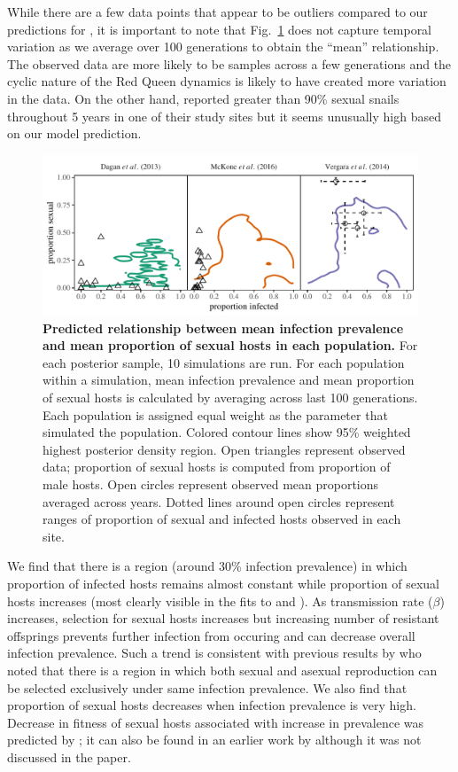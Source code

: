 \documentclass{article}\usepackage[]{graphicx}\usepackage[]{color}
\newcommand{\fref}[1]{Fig.~\ref{fig:#1}}
\begin{document}
While there are a few data points that appear to be outliers compared to our predictions for \cite{vergara2014infection},
it is important to note that \fref{ivs} does not capture temporal variation as we average over 100 generations to obtain the ``mean'' relationship.
The observed data are more likely to be samples across a few generations and the cyclic nature of the Red Queen dynamics is likely to have created more variation in the data.
On the other hand, \cite{vergara2014infection} reported greater than 90\% sexual snails throughout 5 years in one of their study sites but it seems unusually high based on our model prediction.

\begin{figure}[!ht]
\includegraphics[width=\textwidth]{../fig/simulated_data.pdf}
\caption{{\bf Predicted relationship between mean infection prevalence and mean proportion of sexual hosts in each population.}
For each posterior sample, 10 simulations are run.
For each population within a simulation, mean infection prevalence and mean proportion of sexual hosts is calculated by averaging across last 100 generations. 
Each population is assigned equal weight as the parameter that simulated the population.
Colored contour lines show 95\% weighted highest posterior density region.
Open triangles represent observed data; proportion of sexual hosts is computed from proportion of male hosts.
Open circles represent observed mean proportions averaged across years. Dotted lines around open circles represent ranges of proportion of sexual and infected hosts observed in each site.
}
\label{fig:ivs}
\end{figure}

We find that there is a region (around 30\% infection prevalence) in which proportion of infected hosts remains almost constant while proportion of sexual hosts increases (most clearly visible in the fits to \cite{mckone2016fine} and \cite{vergara2014infection}).
As transmission rate ($\beta$) increases, selection for sexual hosts increases but increasing number of resistant offsprings prevents further infection from occuring and can decrease overall infection prevalence.
Such a trend is consistent with previous results by \cite{lively2001trematode} who noted that there is a region in which both sexual and asexual reproduction can be selected exclusively under same infection prevalence.
We also find that proportion of sexual hosts decreases when infection prevalence is very high.
Decrease in fitness of sexual hosts associated with increase in prevalence was predicted by \cite{ashby2015diversity}; 
it can also be found in an earlier work by \cite{lively2010epidemiological} although it was not discussed in the paper.
\end{document}
